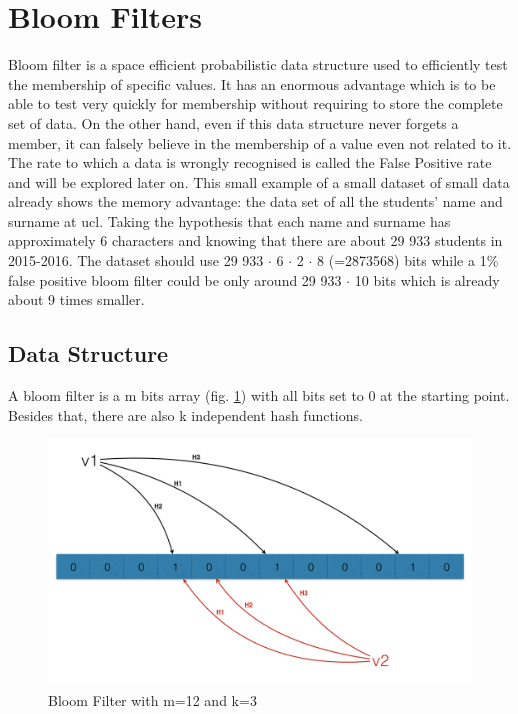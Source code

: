 \documentclass{eplmastersthesis}
\begin{document}
\section{Bloom Filters}
Bloom filter \cite{bloom1970space} is a space efficient probabilistic data structure  used to efficiently test the membership of specific values.
It has an enormous advantage which is to be able to test very quickly for membership without requiring to store the complete set of data. On the other hand, even if this data structure never forgets a member, it can falsely believe in the membership of a value even not related to it. The rate to which a data is wrongly recognised is called the False Positive rate and will be explored later on.
This small example of a small dataset of small data already shows the memory advantage: the data set of all the students' name and surname at \gls{ucl}. Taking the hypothesis that each name and surname has approximately 6 characters and knowing that there are about 29 933 students in 2015-2016. The dataset should use 29 933 $\cdot$ 6 $\cdot$ 2 $\cdot$ 8 (=2873568) bits while a 1\% false positive bloom filter could be only around 29 933 $\cdot$ 10 bits which is already about 9 times smaller.\\

\subsection{Data Structure}
A bloom filter is a m bits array (fig. \ref{bloom-1}) with all bits set to 0 at the starting point. Besides that, there are also k independent hash functions. 

\begin{figure}[h!]
	\begin{center}
		\includegraphics[scale=0.3]{res/bloom-1}
		\caption{Bloom Filter with m=12 and k=3}
		\label{bloom-1}
	\end{center}
\end{figure}
\end{document}
